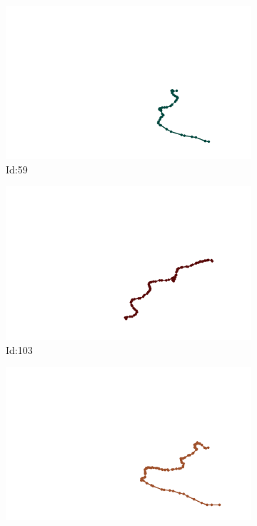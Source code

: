\documentclass[12pt,twoside]{report}
\begin{document}
\begin{figure}
\centering
\begin{subfigure}[b]{0.20\textwidth}
\centering
\includegraphics[width=\textwidth]{../trajectories/59.png}
\caption{Id:59}
\end{subfigure}
\begin{subfigure}[b]{0.20\textwidth}
\centering
\includegraphics[width=\textwidth]{../trajectories/103.png}
\caption{Id:103}
\end{subfigure}
\begin{subfigure}[b]{0.20\textwidth}
\centering
\includegraphics[width=\textwidth]{../trajectories/170.png}

\end{subfigure}
\end{figure}
\end{document}

